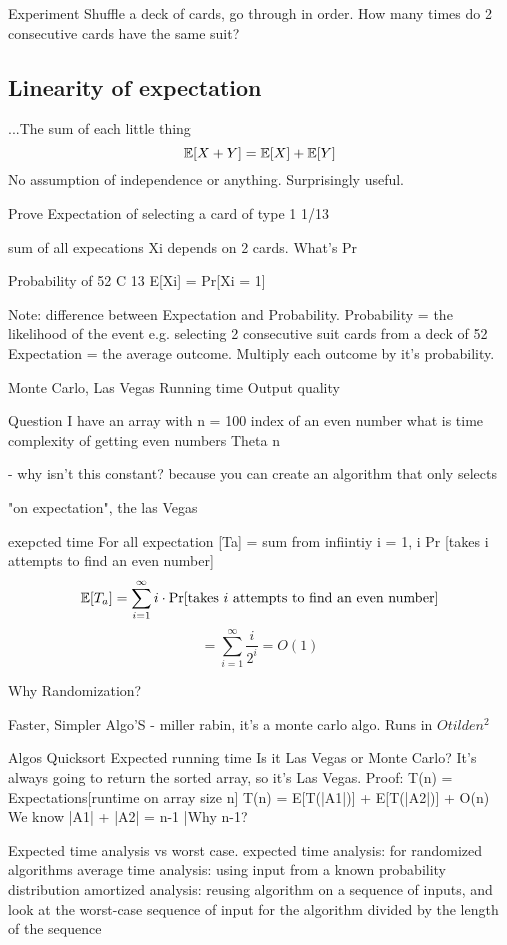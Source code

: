 Experiment
Shuffle a deck of cards, go through in order. How many times do 2 consecutive cards have the same suit?

\subsection{Linearity of expectation}
...The sum of each little thing
\[\mathbb{E} [ X + Y ] = \mathbb{E}[X] + \mathbb{E}[Y]\]
No assumption of independence or anything. Surprisingly useful. 

Prove
Expectation of selecting a card of type 1
1/13

sum of all expecations 
Xi depends on 2 cards. What's Pr

Probability of 
52 C 13
E[Xi] = Pr[Xi = 1] 


Note: difference between Expectation and Probability.
Probability = the likelihood of the event e.g. selecting 2 consecutive suit cards from a deck of 52
Expectation = the average outcome. Multiply each outcome by it's probability. 


Monte Carlo, Las Vegas
Running time
Output quality



Question
I have an array with n = 100
index of an even number
what is time complexity of getting even numbers
Theta n

- why isn't this constant? because you can create an algorithm that only selects 

"on expectation", the las Vegas

exepcted time 
For all expectation [Ta] = sum from infiintiy i = 1, i Pr [takes i attempts to find an even number]
\[
    \mathbb{E}[T_a] = \sum_{i=1}^{\infty} i \cdot \Pr[\text{takes $i$ attempts to find an even number}]
\]
\[
    = \sum_{i=1}^{\infty} \frac{i}{2^i} = O(1)    
\]


Why Randomization?


Faster, Simpler Algo'S
- miller rabin, it's a monte carlo algo. 
Runs in $O tilde n^2$



Algos
Quicksort
Expected running time 
Is it Las Vegas or Monte Carlo?
It's always going to return the sorted array, so it's Las Vegas.
Proof:
T(n) = Expectations[runtime on array size n]
T(n) = E[T(|A1|)] + E[T(|A2|)] + O(n)
We know |A1| + |A2| = n-1 |Why n-1? 

Expected time analysis vs worst case.
expected time analysis: for randomized algorithms
average time analysis: using input from a known probability distribution
amortized analysis: reusing algorithm on a sequence of inputs, and look at the worst-case sequence of input for the algorithm divided by the length of the sequence








